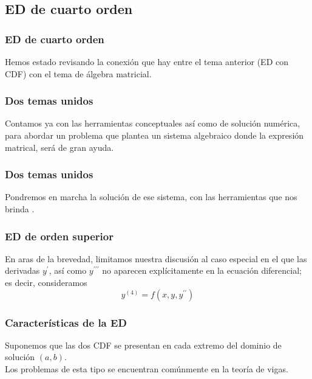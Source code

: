\subsection{ED de cuarto orden}
\begin{frame}
\frametitle{ED de cuarto orden}
Hemos estado revisando la conexión que hay entre el tema anterior (ED con CDF) con el tema de álgebra matricial.
\end{frame}
\begin{frame}
\frametitle{Dos temas unidos}
Contamos ya con las herramientas conceptuales así como de solución numérica, para abordar un problema que plantea un sistema algebraico donde la expresión matrical, será de gran ayuda.
\end{frame}
\begin{frame}
\frametitle{Dos temas unidos}
Pondremos en marcha la solución de ese sistema, con las herramientas que nos brinda \python{}.
\end{frame}
\begin{frame}
\frametitle{ED de orden superior}
En aras de la brevedad, limitamos nuestra discusión al caso especial en el que las derivadas $y^{\prime}$, así como $y^{\prime \prime \prime}$ no aparecen explícitamente en la ecuación diferencial; es decir, consideramos
\[ y^{(4)} = f(x, y, y^{\prime \prime})\]
\end{frame}
\begin{frame}
\frametitle{Características de la ED}
Suponemos que las dos CDF se presentan en cada extremo del dominio de solución $(a, b)$.
\\
\bigskip
Los problemas de esta tipo se encuentran comúnmente en la teoría de vigas.
\end{frame}
